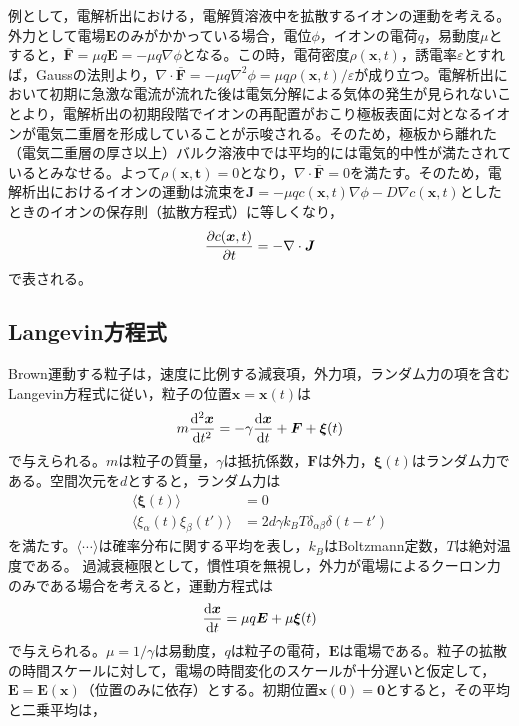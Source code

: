 \documentclass[autodetect-engine,dvi=dvipdfmx,a4paper,ja=standard,oneside,openany,11pt]{bxjsbook}
\begin{document}
例として，電解析出における，電解質溶液中を拡散するイオンの運動を考える。外力として電場$\bm{E}$のみがかかっている場合，電位$\phi$，イオンの電荷$q$，易動度$\mu$とすると，$\bm{\bar{F}}=\mu q\bm{E}=-\mu q \nabla\phi$となる。この時，電荷密度$\rho(\bm{x},t)$，誘電率$\varepsilon$とすれば，Gaussの法則より，$\nabla\cdot\bm{\bar{F}}=-\mu q \nabla^2\phi=\mu q \rho(\bm{x},t)/\varepsilon$が成り立つ。電解析出において初期に急激な電流が流れた後は電気分解による気体の発生が見られないことより，電解析出の初期段階でイオンの再配置がおこり極板表面に対となるイオンが電気二重層を形成していることが示唆される。そのため，極板から離れた（電気二重層の厚さ以上）バルク溶液中では平均的には電気的中性が満たされているとみなせる。よって$\rho(\bm{x,t})=0$となり，$\nabla\cdot\bar{\bm{F}}=0$を満たす。そのため，電解析出におけるイオンの運動は流束を$\bm{J}=-\mu qc(\bm{x},t) \nabla\phi-D\nabla c(\bm{x},t)$としたときのイオンの保存則（拡散方程式）に等しくなり，
\begin{equation}
  \pdv{c(\bm{x},t)}{t}=-\nabla\cdot\bm{J}
  \label{eq:RW_diffusion_result_divergence_ion}
\end{equation}
で表される。
\subsection{Langevin方程式}
\label{sec:Langevin}
Brown運動する粒子は，速度に比例する減衰項，外力項，ランダム力の項を含むLangevin方程式に従い，粒子の位置$\bm{x}=\bm{x}(t)$は
\begin{equation}
  m\odv[2]{\bm{x}}{t}=-\gamma\odv{\bm{x}}{t}+\bm{F}+\bm{\xi}(t)
  \label{eq:Langevin}
\end{equation}
で与えられる。$m$は粒子の質量，$\gamma$は抵抗係数，$\bm{F}$は外力，$\bm{\xi}(t)$はランダム力である。空間次元を$d$とすると，ランダム力は
\begin{equation}
  \begin{split}
    \langle\bm{\xi}(t)\rangle                & =0                                              \\
    \langle\xi_\alpha(t)\xi_\beta(t')\rangle & =2d\gamma k_B T\delta_{\alpha\beta}\delta(t-t')
  \end{split}
  \label{eq:random_force}
\end{equation}
を満たす。$\langle\cdots\rangle$は確率分布に関する平均を表し，$k_B$はBoltzmann定数，$T$は絶対温度である。
過減衰極限として，慣性項を無視し，外力が電場によるクーロン力のみである場合を考えると，運動方程式は
\begin{equation}
  \odv{\bm{x}}{t}=\mu q\bm{E}+\mu\bm{\xi}(t)
  \label{eq:Langevin_overdamped}
\end{equation}
で与えられる。$\mu=1/\gamma$は易動度，$q$は粒子の電荷，$\bm{E}$は電場である。粒子の拡散の時間スケールに対して，電場の時間変化のスケールが十分遅いと仮定して，$\bm{E}=\bm{E}(\bm{x})$（位置のみに依存）とする。初期位置$\bm{x}(0)=\bm{0}$とすると，その平均と二乗平均は，
\end{document}
